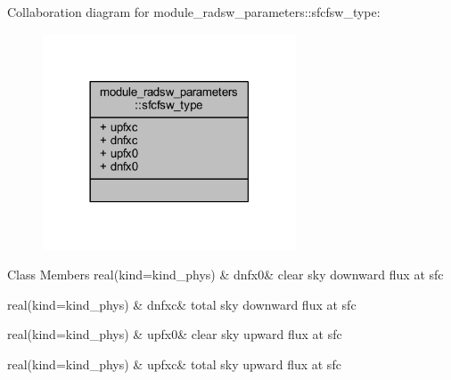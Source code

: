 Collaboration diagram for module\+\_\+radsw\+\_\+parameters\+:\+:sfcfsw\+\_\+type\+:\nopagebreak
\begin{figure}[H]
\begin{center}
\leavevmode
\includegraphics[width=213pt]{structmodule__radsw__parameters_1_1sfcfsw__type__coll__graph}
\end{center}
\end{figure}
\begin{DoxyFields}{Class Members}
real(kind=kind\+\_\+phys)\hypertarget{group__module__radsw__main_ga2b1a4d8e0e93332fd08f3aa6b68fb141}{}\label{group__module__radsw__main_ga2b1a4d8e0e93332fd08f3aa6b68fb141}
&
dnfx0&
clear sky downward flux at sfc \\
\hline

real(kind=kind\+\_\+phys)\hypertarget{group__module__radsw__main_ga0e5e6bfe14ffd1a9c1c8abfc730db4ba}{}\label{group__module__radsw__main_ga0e5e6bfe14ffd1a9c1c8abfc730db4ba}
&
dnfxc&
total sky downward flux at sfc \\
\hline

real(kind=kind\+\_\+phys)\hypertarget{group__module__radsw__main_ga6bfa85d5917ebc4ebc4ef079e3cf3eca}{}\label{group__module__radsw__main_ga6bfa85d5917ebc4ebc4ef079e3cf3eca}
&
upfx0&
clear sky upward flux at sfc \\
\hline

real(kind=kind\+\_\+phys)\hypertarget{group__module__radsw__main_ga89e2285e3148921e989cb27cda4294a1}{}\label{group__module__radsw__main_ga89e2285e3148921e989cb27cda4294a1}
&
upfxc&
total sky upward flux at sfc \\
\hline

\end{DoxyFields}
\label{structmodule__radsw__parameters_1_1profsw__type}
\hypertarget{group__module__radsw__main_structmodule__radsw__parameters_1_1profsw__type}{}
